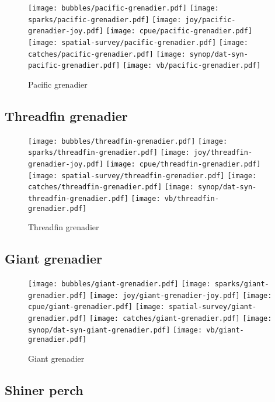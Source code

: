 \begin{figure}[htbp]
\centering
\texttt{[image: bubbles/pacific-grenadier.pdf]}
\texttt{[image: sparks/pacific-grenadier.pdf]}
\texttt{[image: joy/pacific-grenadier-joy.pdf]}
\texttt{[image: cpue/pacific-grenadier.pdf]}
\texttt{[image: spatial-survey/pacific-grenadier.pdf]}
\texttt{[image: catches/pacific-grenadier.pdf]}
\texttt{[image: synop/dat-syn-pacific-grenadier.pdf]}
\texttt{[image: vb/pacific-grenadier.pdf]}
\caption{Pacific grenadier}
\end{figure}
\clearpage
\subsection*{Threadfin grenadier}

\begin{figure}[htbp]
\centering
\texttt{[image: bubbles/threadfin-grenadier.pdf]}
\texttt{[image: sparks/threadfin-grenadier.pdf]}
\texttt{[image: joy/threadfin-grenadier-joy.pdf]}
\texttt{[image: cpue/threadfin-grenadier.pdf]}
\texttt{[image: spatial-survey/threadfin-grenadier.pdf]}
\texttt{[image: catches/threadfin-grenadier.pdf]}
\texttt{[image: synop/dat-syn-threadfin-grenadier.pdf]}
\texttt{[image: vb/threadfin-grenadier.pdf]}
\caption{Threadfin grenadier}
\end{figure}
\clearpage
\subsection*{Giant grenadier}

\begin{figure}[htbp]
\centering
\texttt{[image: bubbles/giant-grenadier.pdf]}
\texttt{[image: sparks/giant-grenadier.pdf]}
\texttt{[image: joy/giant-grenadier-joy.pdf]}
\texttt{[image: cpue/giant-grenadier.pdf]}
\texttt{[image: spatial-survey/giant-grenadier.pdf]}
\texttt{[image: catches/giant-grenadier.pdf]}
\texttt{[image: synop/dat-syn-giant-grenadier.pdf]}
\texttt{[image: vb/giant-grenadier.pdf]}
\caption{Giant grenadier}
\end{figure}
\clearpage
\subsection*{Shiner perch}

